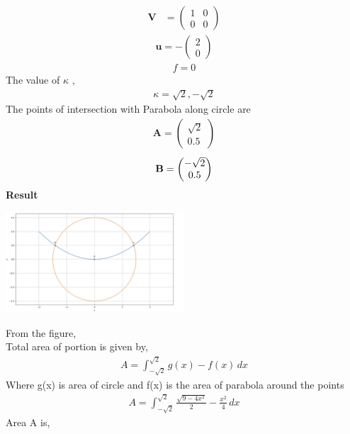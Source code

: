 \documentclass[10pt,a4paper]{report}
\newcommand{\myvec}[1]{\ensuremath{\begin{pmatrix}#1\end{pmatrix}}}
\let\vec\mathbf
\let\vec\mathbf
\begin{document}
\begin{multicols}{2}
\begin{align}
	\vec{V} &= \myvec{
1 & 0\\
0 & 0
    }
\end{align}
\begin{align}
	\vec{u} = -\myvec{2 \\0}
 \end{align}
 \begin{align}
  f = 0
 \end{align}
The value of $\kappa$ ,\\
\begin{align}
    \kappa = \sqrt{2},-\sqrt{2}
\end{align}
The points of intersection with Parabola along circle are \\
\begin{align}
    \vec{A}=\myvec{
\sqrt{2}\\
0.5
    }
\end{align}
\begin{align}
    \vec{B}=\myvec{
-\sqrt{2}\\
0.5
    } \vspace{2mm}    
\end{align}
\textbf{Result}\\
\begin{center}
 \includegraphics[width=0.5\textwidth]{conic.jpg}  
 \end{center}\vspace{1mm}
 From the figure,\\ \vspace{1mm}
Total area of portion is given by, \\ \vspace{1mm}
\begin{align}
 A=  \int_{-\sqrt{2}}^{\sqrt{2}} g(x)-f(x) \,dx 
\end{align}
Where g(x) is area of circle and f(x) is the area of parabola around the points\\ \vspace{1mm}
\begin{align}
A= \int_{-\sqrt{2}}^{\sqrt{2}} \frac{\sqrt{9-4x^2}}{2}-\frac{x^2}{4} \,dx 
\end{align}
Area A is,\\ 

\end{multicols}
\end{document}
